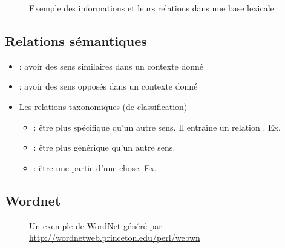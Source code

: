 \documentclass{KodeBook}
\begin{document}
\begin{figure}
	\centering 
	\caption{Exemple des informations et leurs relations dans une base lexicale \cite{2019-white-al}}
\end{figure}

\subsection{Relations sémantiques}

\begin{itemize}
	\item {} : avoir des sens similaires dans un contexte donné
	\item {} : avoir des sens opposés dans un contexte donné
	\item Les relations taxonomiques (de classification)
	\begin{itemize}
		\item {} : être plus spécifique qu'un autre sens. Il entraîne un relation . Ex.  
		\item {} : être plus générique qu'un autre sens. 
		\item {} : être une partie d'une chose. Ex. 
	\end{itemize}
\end{itemize}

\subsection{Wordnet}

\begin{figure}
	\caption{Un exemple de WordNet généré par \url{http://wordnetweb.princeton.edu/perl/webwn}}
\end{figure}
\end{document}
